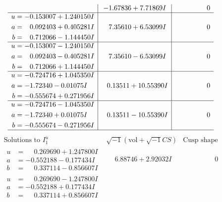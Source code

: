 \documentclass[1p]{elsarticle_modified}
\theoremstyle{definition}
\newcommand{\I}{\sqrt{-1}}
\begin{document}
$$\begin{array}{c|c|c}
 & -1.67836 + 7.71869 I & \phantom{-0.000000 } 0 \\ \hline\begin{aligned}
u &= -0.153007 + 1.240150 I \\
a &= \phantom{-}0.092403 + 0.405281 I \\
b &= \phantom{-}0.712066 - 1.144450 I\end{aligned}
 & \phantom{-}7.35610 + 6.53099 I & \phantom{-0.000000 } 0 \\ \hline\begin{aligned}
u &= -0.153007 - 1.240150 I \\
a &= \phantom{-}0.092403 - 0.405281 I \\
b &= \phantom{-}0.712066 + 1.144450 I\end{aligned}
 & \phantom{-}7.35610 - 6.53099 I & \phantom{-0.000000 } 0 \\ \hline\begin{aligned}
u &= -0.724716 + 1.045350 I \\
a &= -1.72340 - 0.01075 I \\
b &= -0.555674 + 0.271956 I\end{aligned}
 & \phantom{-}0.13511 + 10.55390 I & \phantom{-0.000000 } 0 \\ \hline\begin{aligned}
u &= -0.724716 - 1.045350 I \\
a &= -1.72340 + 0.01075 I \\
b &= -0.555674 - 0.271956 I\end{aligned}
 & \phantom{-}0.13511 - 10.55390 I & \phantom{-0.000000 } 0\\
 \hline 
 \end{array}$$\newpage$$\begin{array}{c|c|c}  
\text{Solutions to }I^u_{1}& \I (\text{vol} + \sqrt{-1}CS) & \text{Cusp shape}\\
 \hline 
\begin{aligned}
u &= \phantom{-}0.269690 + 1.247800 I \\
a &= -0.552188 - 0.177434 I \\
b &= \phantom{-}0.337114 - 0.856607 I\end{aligned}
 & \phantom{-}6.88746 + 2.92032 I & \phantom{-0.000000 } 0 \\ \hline\begin{aligned}
u &= \phantom{-}0.269690 - 1.247800 I \\
a &= -0.552188 + 0.177434 I \\
b &= \phantom{-}0.337114 + 0.856607 I\end{aligned}

\end{array}$$
\end{document}
